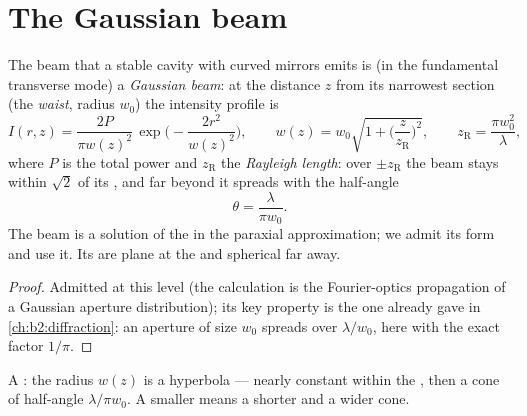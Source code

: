 \section{The Gaussian beam}

\begin{proposition}\label{prop:b2:laser:gaussian}
The beam that a stable cavity with curved mirrors emits is (in the
fundamental transverse mode) a \emph{Gaussian beam}: at the distance $z$ from its narrowest section (the
\emph{waist}, radius $w_0$) the intensity
profile is
\[
I(r,z) = \frac{2P}{\pi w(z)^2}\,\exp\Big(-\frac{2r^2}{w(z)^2}\Big),
\qquad
w(z) = w_0\sqrt{1 + \Big(\frac{z}{z_{\text{R}}}\Big)^2},
\qquad
z_{\text{R}} = \frac{\pi w_0^2}{\lambda},
\]
where $P$ is the total power and $z_{\text{R}}$ the \emph{Rayleigh
length}: over $\pm z_{\text{R}}$ the beam stays
within $\sqrt2$ of its , and far beyond it spreads with the
half-angle
\[
\theta = \frac{\lambda}{\pi w_0} .
\]
The beam is a solution of the  in the paraxial
approximation; we admit its form and use it. Its  are plane at
the  and spherical far away.
\end{proposition}

\begin{proof}
Admitted at this level (the calculation is the Fourier-optics
propagation of a Gaussian aperture distribution); its key property is
the one  already gave in \cref{ch:b2:diffraction}: an
aperture of size $w_0$ spreads over $\lambda/w_0$, here with the exact
factor $1/\pi$.
\end{proof}

\begin{omfigure}

{\small A : the radius $w(z)$ is a hyperbola --- nearly
constant within the , then a cone of half-angle
$\lambda/\pi w_0$. A smaller  means a shorter  and a
wider cone.}
\end{omfigure}

